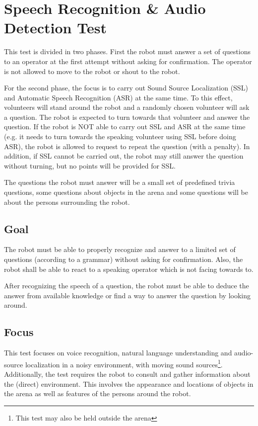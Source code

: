 \section{Speech Recognition \& Audio Detection Test}

This test is divided in two phases. First the robot must answer a set of questions to an operator at the first attempt without asking for confirmation. The operator is not allowed to move to the robot or shout to the robot.

For the second phase, the focus is to carry out Sound Source Localization (SSL) and Automatic Speech Recognition (ASR) at the same time. To this effect, volunteers will stand around the robot and a randomly chosen volunteer will ask a question. The robot is expected to turn towards that volunteer and answer the question. If the robot is NOT able to carry out SSL and ASR at the same time (e.g. it needs to turn towards the speaking volunteer using SSL before doing ASR), the robot is allowed to request to repeat the question (with a penalty). In addition, if SSL cannot be carried out, the robot may still answer the question without turning, but no points will be provided for SSL.

The questions the robot must answer will be a small set of predefined trivia questions, some questions about objects in the arena and some questions will be about the persons surrounding the robot.

\subsection{Goal}
The robot must be able to properly recognize and answer to a limited set of questions (according to a grammar) without asking for confirmation. 
Also, the robot shall be able to react to a speaking operator which is not facing towards to.

After recognizing the speech of a question, the robot must be able to deduce the answer from available knowledge or find a way to answer the question by looking around.

\subsection{Focus}
This test focuses on voice recognition, natural language understanding and audio-source localization in a noisy environment, with moving sound sources\footnote{This test may also be held outside the arena}.
Additionally, the test requires the robot to consult and gather information about the (direct) environment.
This involves the appearance and locations of objects in the arena as well as features of the persons around the robot. 

